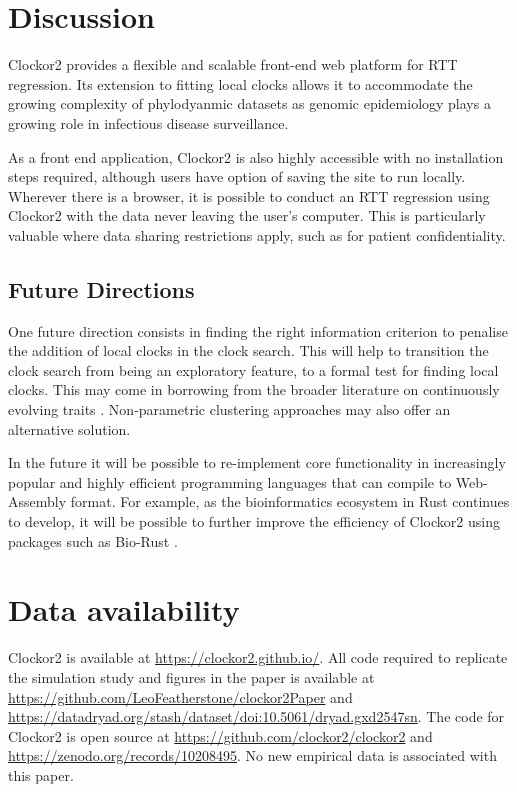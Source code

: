 \documentclass{article}
\begin{document}
\section*{Discussion}
Clockor2 provides a flexible and scalable front-end web platform for RTT regression. Its extension to fitting local clocks allows it to accommodate the growing complexity of phylodyanmic datasets as genomic epidemiology plays a growing role in infectious disease surveillance. 

As a front end application, Clockor2 is also highly accessible with no installation steps required, although users have option of saving the site to run locally. Wherever there is a browser, it is possible to conduct an RTT regression using Clockor2 with the data never leaving the user's computer. {This is particularly valuable where data sharing restrictions apply, such as for patient confidentiality.}

\subsection*{Future Directions}
{One future direction consists in finding the right information criterion to penalise the addition of local clocks in the clock search. This will help to transition the clock search from being an exploratory feature, to a formal test for finding local clocks. This may come in borrowing from the broader literature on continuously evolving traits \citep{bastide_2017_detection,khabbazian_2016_fast}.} Non-parametric clustering approaches may also offer an alternative solution.

In the future it will be possible to re-implement core functionality in increasingly popular and highly efficient programming languages that can compile to Web-Assembly format. For example, as the bioinformatics ecosystem in Rust continues to develop, it will be possible to further improve the efficiency of Clockor2 using packages such as Bio-Rust \citep{koester_rust-bio-2015}.

\section*{Data availability}
{Clockor2 is available at \url{https://clockor2.github.io/}}. All code required to replicate the simulation study and figures in the paper is available at \url{https://github.com/LeoFeatherstone/clockor2Paper} and \url{https://datadryad.org/stash/dataset/doi:10.5061/dryad.gxd2547sn}. The code for Clockor2 is open source at \url{https://github.com/clockor2/clockor2} and \url{https://zenodo.org/records/10208495}. No new empirical data is associated with this paper.
\end{document}
